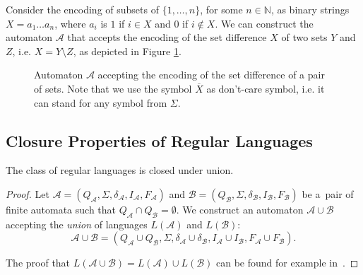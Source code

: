 	\noindent\hrulefill
	\begin{example}
	Consider the encoding of subsets of $\{1,\ldots,n\}$, for some $n \in
	\mathbb{N}$, as binary strings $X = a_1\ldots a_n$, where $a_i$ is $1$ if $i \in X$ and $0$ if
	$i \notin X$. We can construct the automaton $\mathcal{A}$ that accepts the
	encoding of the set difference $X$ of two sets $Y$ and $Z$, i.e. $X = Y
	\setminus Z$, as depicted in Figure \ref{set-automaton}.
	
	\begin{figure}[h!]
	\begin{center}
	 \end{center}
	 \caption{Automaton $\mathcal{A}$ accepting the encoding of the set difference
	 of a pair of sets. Note that we use the symbol $\overline{X}$ as
	 don't-care symbol, i.e. it can stand for any symbol
	 from $\Sigma$.}\label{set-automaton}
	\end{figure}
	\end{example}
	
	\noindent\hrulefill
	
 \subsection{Closure Properties of Regular Languages}

\begin{theorem}
 The class of regular languages is closed under union.
\end{theorem}

\begin{proof}
Let $\mathcal{A} = (Q_\mathcal{A}, \Sigma, \delta_\mathcal{A}, I_\mathcal{A},
F_\mathcal{A})$ and $\mathcal{B} = (Q_\mathcal{B}, \Sigma, \delta_\mathcal{B},
I_\mathcal{B}, F_\mathcal{B})$ be a~pair of finite automata such that
$Q_\mathcal{A} \cap Q_\mathcal{B} = \emptyset$. We construct an automaton
$\mathcal{A} \cup \mathcal{B}$ accepting the \emph{union} of languages
$L(\mathcal{A})$ and $L(\mathcal{B})$: 
\begin{equation} \mathcal{A} \cup \mathcal{B} = (Q_\mathcal{A} \cup
 Q_\mathcal{B}, \Sigma, \delta_\mathcal{A} \cup \delta_\mathcal{B},
 I_\mathcal{A} \cup I_\mathcal{B}, F_\mathcal{A} \cup
F_\mathcal{B}).
\end{equation}

\noindent The proof that $L(\mathcal{A} \cup \mathcal{B}) = L(\mathcal{A}) \cup
L(\mathcal{B})$ can be found for example in~\cite{tin}.
\end{proof}

